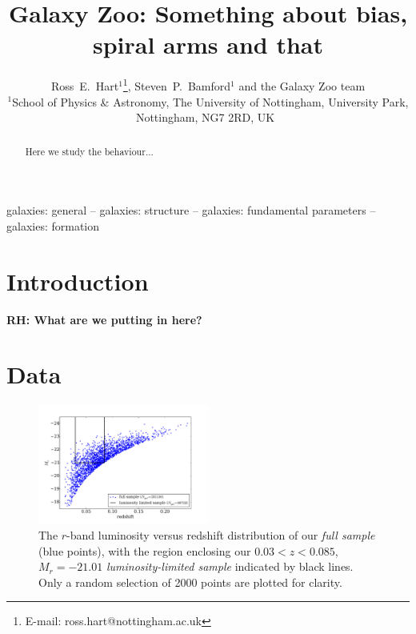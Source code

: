 \documentclass[useAMS,usenatbib]{mn2e}
\newcommand{\rh}[1]{{\bf \textcolor{RoyalPurple}{RH: #1}}}
\begin{document}
\title{Galaxy Zoo: Something about bias, spiral arms and that}
\author[Hart et al.]{Ross~E.~Hart$^1$\thanks{E-mail: ross.hart@nottingham.ac.uk}, Steven~P.~Bamford$^1$ and the Galaxy Zoo team
\smallskip\\
$^{1}$School of Physics \& Astronomy, The University of Nottingham, University Park, Nottingham, NG7 2RD, UK\
}
\maketitle
\begin{abstract}
Here we study the behaviour...
\end{abstract}

\begin{keywords}
galaxies: general -- galaxies: structure -- galaxies: fundamental parameters -- galaxies: formation
\end{keywords}

\section{Introduction}
\label{sec:intro}

\rh{What are we putting in here?}

\section{Data}
\label{sec:data}

\begin{figure}
		\centering
		\includegraphics[width=0.5\textwidth]{Data_imgs/volume_limited_sample.pdf}
    \caption{The $r$-band luminosity versus redshift distribution of our \textit{full sample} (blue points), with the region enclosing our $0.03<z<0.085$, $M_r  = -21.01$ \textit{luminosity-limited sample} indicated by black lines. Only a random selection of 2000 points are plotted for clarity.
		\label{fig:vl_sample}}
\end{figure}
\end{document}
